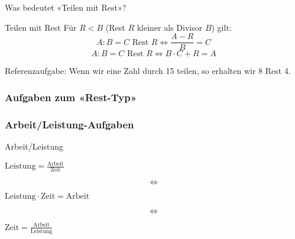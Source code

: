 Was bedeutet «Teilen mit Rest»?


\begin{gesetz}{Teilen mit Rest}{}
  Für $R<B$ (Rest $R$ kleiner als Divisor $B$) gilt:
  $$A : B = C \text{ Rest } R \Longleftrightarrow \frac{A - R}{B} = C$$
  $$A : B = C \text{ Rest } R \Longleftrightarrow B\cdot{}C + R = A $$
  \end{gesetz}

  Referenzaufgabe: Wenn wir eine Zahl durch 15 teilen, so erhalten wir
  8 Rest 4.



  \subsubsection*{Aufgaben zum «Rest-Typ»}

\newpage

\subsubsection{Arbeit/Leistung-Aufgaben}

\begin{gesetz}{Arbeit/Leistung}{}
  \begin{center}
    $\text{Leistung} = \frac{\mathrm{Arbeit}}{\mathrm{Zeit}}$
  \end{center}
  
  $$\Longleftrightarrow$$
  \begin{center}
    $\mathrm{Leistung} \cdot{} \text{Zeit} = \text{Arbeit}$
  \end{center}

  $$\Longleftrightarrow$$
  \begin{center}
    $\text{Zeit} = \frac{\mathrm{Arbeit}}{\mathrm{Leistung}}$
  \end{center}
 
\end{gesetz}


